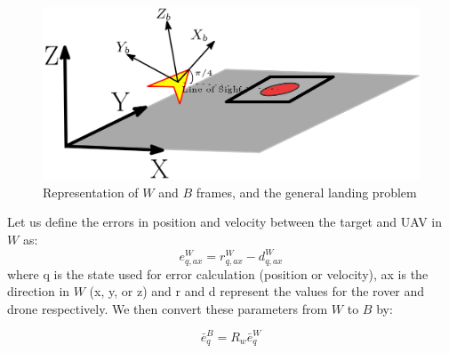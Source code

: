 \documentclass[conf]{new-aiaa}
\begin{document}
\begin{figure}
	\centering
	\includegraphics[scale=0.125]{drone.png}
	\caption{Representation of $W$ and $B$ frames, and the general landing problem}  \label{fig:drone}
\end{figure}

Let us define the errors in position and velocity between the target and UAV in $W$ as:
\begin{equation}
e_{q,ax}^{W} = r_{q,ax}^{W} - d_{q,ax}^{W}
\end{equation}
where q is the state used for error calculation (position or velocity), ax is the direction in $W$ (x, y, or z) and r and d represent the values for the rover and drone respectively. We then convert these parameters from $W$ to $B$ by:

\begin{equation}
\bar{e}_{q}^{B} = R_{w}\bar{e}_{q}^{W}
\end{equation}
\end{document}
